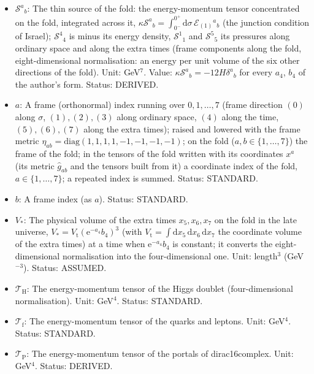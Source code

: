 \documentclass[
  10pt,
]{article}
\providecommand{\tightlist}{%
  \setlength{\itemsep}{0pt}\setlength{\parskip}{0pt}}
\begin{document}
\begin{itemize}
\tightlist
\item
  \(\mathcal{S}^a{}_b\): The thin source of the fold: the
  energy-momentum tensor concentrated on the fold, integrated across it,
  \(\kappa\mathcal{S}^a{}_b = \int_{0^-}^{0^+}\mathrm{d}\sigma\,\mathcal{E}_{(1)}{}^a{}_b\)
  (the junction condition of Israel); \(\mathcal{S}^4{}_4\) is minus its
  energy density, \(\mathcal{S}^1{}_1\) and \(\mathcal{S}^5{}_5\) its
  pressures along ordinary space and along the extra times (frame
  components along the fold, eight-dimensional normalisation: an energy
  per unit volume of the six other directions of the fold). Unit:
  GeV\(^7\). Value: \(\kappa\mathcal{S}^a{}_b = -12H\delta^a{}_b\) for
  every \(a_4\), \(b_4\) of the author's form. Status: DERIVED.
\item
  \(a\): A frame (orthonormal) index running over \(0, 1, \dots, 7\)
  (frame direction \((0)\) along \(\sigma\), \((1), (2), (3)\) along
  ordinary space, \((4)\) along the time, \((5), (6), (7)\) along the
  extra times); raised and lowered with the frame metric
  \(\eta_{ab} = \mathrm{diag}(1, 1, 1, 1, -1, -1, -1, -1)\); on the fold
  (\(a, b \in \{1, \dots, 7\}\)) the frame of the fold; in the tensors
  of the fold written with its coordinates \(x^a\) (its metric
  \(\hat g_{ab}\) and the tensors built from it) a coordinate index of
  the fold, \(a \in \{1, \dots, 7\}\); a repeated index is summed.
  Status: STANDARD.
\item
  \(b\): A frame index (as \(a\)). Status: STANDARD.
\item
  \(V_*\): The physical volume of the extra times \(x_5, x_6, x_7\) on
  the fold in the late universe,
  \(V_* = V_{\mathrm{t}}(\mathrm{e}^{-a_4}b_4)^3\) (with
  \(V_{\mathrm{t}} = \int\mathrm{d}x_5\,\mathrm{d}x_6\,\mathrm{d}x_7\)
  the coordinate volume of the extra times) at a time when
  \(\mathrm{e}^{-a_4}b_4\) is constant; it converts the
  eight-dimensional normalisation into the four-dimensional one. Unit:
  length\(^3\) (GeV\(^{-3}\)). Status: ASSUMED.
\item
  \(\mathcal{T}_{\mathrm{H}}\): The energy-momentum tensor of the Higgs
  doublet (four-dimensional normalisation). Unit: GeV\(^4\). Status:
  STANDARD.
\item
  \(\mathcal{T}_{\mathrm{f}}\): The energy-momentum tensor of the quarks
  and leptons. Unit: GeV\(^4\). Status: STANDARD.
\item
  \(\mathcal{T}_{\mathrm{P}}\): The energy-momentum tensor of the
  portals of dirac16complex. Unit: GeV\(^4\). Status: DERIVED.

\end{itemize}
\end{document}
